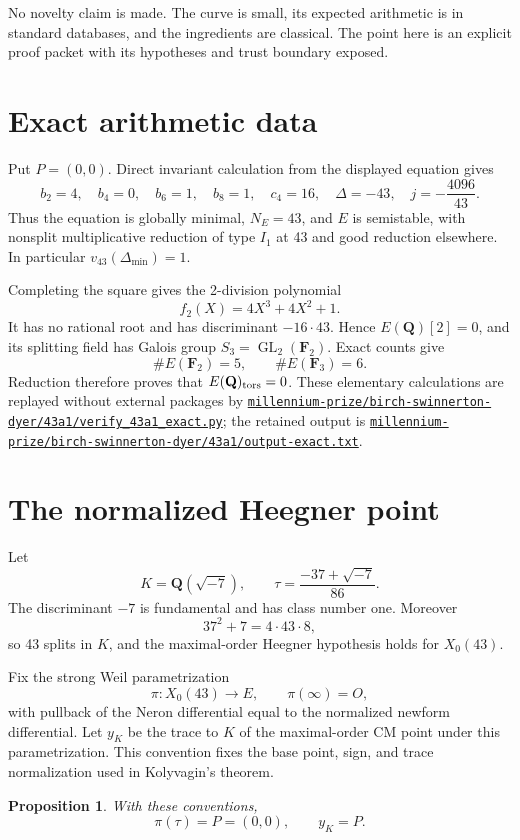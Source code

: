 \documentclass[11pt]{article}
\newtheorem{proposition}[theorem]{Proposition}
\newcommand{\Q}{\mathbf Q}
\newcommand{\F}{\mathbf F}
\newcommand{\artifact}[1]{\href{run:../#1}{\nolinkurl{#1}}}
\begin{document}
No novelty claim is made.  The curve is small, its expected arithmetic is in
standard databases, and the ingredients are classical.  The point here is an
explicit proof packet with its hypotheses and trust boundary exposed.

\section{Exact arithmetic data}

Put \(P=(0,0)\).  Direct invariant calculation from the displayed equation
gives
\[
 b_2=4,\quad b_4=0,\quad b_6=1,\quad b_8=1,
 \quad c_4=16,
 \quad \Delta=-43,
 \quad j=-\frac{4096}{43}.
\]
Thus the equation is globally minimal, \(N_E=43\), and \(E\) is semistable,
with nonsplit multiplicative reduction of type \(I_1\) at 43 and good
reduction elsewhere.  In particular \(v_{43}(\Delta_{\min})=1\).

Completing the square gives the 2-division polynomial
\[
 f_2(X)=4X^3+4X^2+1.
\]
It has no rational root and has discriminant \(-16\cdot43\).  Hence
\(E(\Q)[2]=0\), and its splitting field has Galois group
\(S_3=\operatorname{GL}_2(\F_2)\).  Exact counts give
\[
 \#E(\F_2)=5,\qquad \#E(\F_3)=6.
\]
Reduction therefore proves that \(E(\Q)_{\rm tors}=0\).  These elementary
calculations are replayed without external packages by
\artifact{millennium-prize/birch-swinnerton-dyer/43a1/verify_43a1_exact.py};
the retained output is
\artifact{millennium-prize/birch-swinnerton-dyer/43a1/output-exact.txt}.

\section{The normalized Heegner point}

Let
\[
 K=\Q(\sqrt{-7}),\qquad
 \tau=\frac{-37+\sqrt{-7}}{86}.
\]
The discriminant \(-7\) is fundamental and has class number one.  Moreover
\[
 37^2+7=4\cdot43\cdot8,
\]
so 43 splits in \(K\), and the maximal-order Heegner hypothesis holds for
\(X_0(43)\).

Fix the strong Weil parametrization
\[
 \pi:X_0(43)\longrightarrow E,
 \qquad \pi(\infty)=O,
\]
with pullback of the Neron differential equal to the normalized newform
differential.  Let \(y_K\) be the trace to \(K\) of the maximal-order CM point
under this parametrization.  This convention fixes the base point, sign, and
trace normalization used in Kolyvagin's theorem.

\begin{proposition}\label{prop:heegner}
With these conventions,
\[
 \pi(\tau)=P=(0,0),\qquad y_K=P.
\]
\end{proposition}
\end{document}
